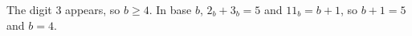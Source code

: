 The digit $3$ appears, so $b\ge4$. In base $b$, $2_b+3_b=5$ and $11_b=b+1$, so $b+1=5$ and $b=\boxed{4}$.
